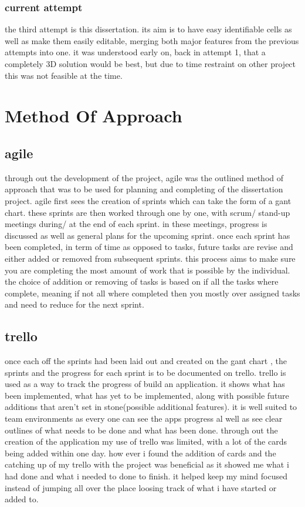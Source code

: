 
\subsubsection{current attempt}
the third attempt is this dissertation. its aim is to have easy identifiable cells as well as make them easily editable, merging both major features from the previous attempts into one. it was understood early on, back in attempt 1, that a completely 3D solution would be best, but due to time restraint on other project this was not feasible at the time.




\section{Method Of Approach}
\subsection{agile}
through out the development of the project, agile was the outlined method of approach that was to be used for planning and completing of the dissertation project. agile first sees the creation of sprints which can take the form of a gant chart. these sprints are then worked through one by one, with scrum/ stand-up meetings during/ at the end of each sprint. in these meetings, progress is discussed as well as general plans for the upcoming sprint.  once each sprint has been completed, in term of time as opposed to tasks, future tasks are revise and either added or removed from subsequent sprints. this process aims to make sure you are completing the most amount of work that is possible by the individual. the choice of addition or removing of tasks is based on if all the tasks where complete, meaning if not all where completed then you mostly over assigned tasks and need to reduce for the next sprint.
 
\subsection{trello}
once each off the sprints had been laid out and created on the gant chart , the sprints and the progress for each sprint is to be documented on trello.
trello is used as a way to track the progress of build an application. it shows what has been implemented, what has yet to be implemented, along with possible future additions that aren't set in stone(possible additional features). it is well suited to team environments as every one can see the apps progress al well as see clear outlines of what needs to be done and what has been done. 
through out the creation of the application my use of trello was limited, with a lot of the cards being added within one day. how ever i found the addition of cards and the catching up of my trello with the project was beneficial as it showed me what i had done and what i needed to done to finish. it helped keep my mind focused instead of  jumping all over the place loosing track of what i have started or added to.

